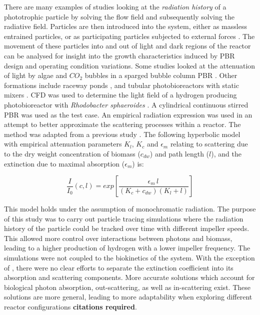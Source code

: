 There are many examples of studies looking at the \textit{radiation history} of a phototrophic particle by solving the flow field and subsequently solving the radiative field. Particles are then introduced into the system, either as massless entrained particles, or as participating particles subjected to external forces \cite{Zhang2013}. The movement of these particles into and out of light and dark regions of the reactor can be analysed for insight into the growth characteristics induced by PBR design and operating condition variations. Some studies looked at the attenuation of light by algae and $CO_2$ bubbles in a sparged bubble column PBR \cite{Hochhalter2014}. Other formations include raceway ponds \cite{Gharagozloo2014a,Park2015}, and tubular photobioreactors with static mixers \cite{Cheng2016}. CFD was used to determine the light field of a hydrogen producing photobioreactor with \textit{Rhodobacter sphaeroides} \cite{Krujatz2015}. A cylindrical continuous stirred PBR was used as the test case. An empirical radiation expression was used in an attempt to better approximate the scattering processes within a reactor. The method was adapted from a previous study \cite{Suh2003}. The following hyperbolic model with empirical attenuation parameters $K_l$, $K_c$ and $\epsilon_m$ relating to scattering due to the dry weight concentration of biomass ($c_{dw}$) and path length ($l$), and the extinction due to maximal absorption ($\epsilon_m$) is:


\begin{equation} 
\frac{I}{I_0} (c,l) = exp \left[\frac{\epsilon_m \, l \, }{(K_c + c_{dw})(K_l + l)}\right]
\end{equation}

This model holds under the assumption of monochromatic radiation. The purpose of this study was to carry out particle tracing simulations where the radiation history of the particle could be tracked over time with different impeller speeds. This allowed more control over interactions between photons and biomass, leading to a higher production of hydrogen with a lower impeller frequency. The simulations were not coupled to the biokinetics of the system. With the exception of \cite{Gharagozloo2014a,Krujatz2015}, there were no clear efforts to separate the extinction coefficient into its absorption and scattering components. More accurate solutions which account for biological photon absorption, out-scattering, as well as in-scattering exist. These solutions are more general, leading to more adaptability when exploring different reactor configurations \textbf{citations required}.

